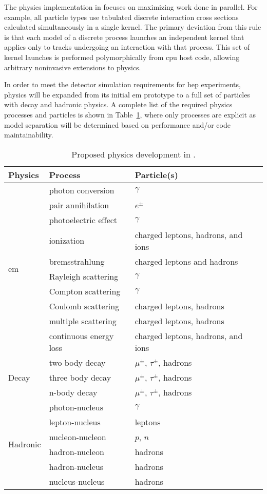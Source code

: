 The physics implementation in \celeritas focuses on maximizing work done in
parallel. For example, all particle types use tabulated discrete interaction
cross sections calculated simultaneously in a single kernel. The primary
deviation from this rule is that each model of a discrete process launches an
independent kernel that applies only to tracks undergoing an interaction with
that process. This set of kernel launches is performed polymorphically from
\ac{cpu} host code, allowing arbitrary noninvasive extensions to \celeritas
physics.

In order to meet the detector simulation requirements for \acs{hep} experiments,
\celeritas physics will be expanded from its initial \ac{em} prototype to a full
set of particles with decay and hadronic physics.  A complete list of the
required physics processes and particles is shown in
Table~\ref{tab:proposed-physics}, where only processes are explicit as model
separation will be determined based on performance and/or code maintainability.
\begin{table}
  \caption{Proposed physics development in \celeritas.}
  \label{tab:proposed-physics}
  \centering
  \begin{tabular}{llll}
    \toprule
    Physics & Process & Particle(s)\\
    \midrule
    \multirow{10}{*}{\acs{em}} & photon conversion & $\gamma$\\
    & pair annihilation & $e^\pm$\\
    & photoelectric effect& $\gamma$\\
    & ionization & charged leptons, hadrons, and ions\\
    & bremsstrahlung & charged leptons and hadrons\\
    & Rayleigh scattering & $\gamma$\\
    & Compton scattering & $\gamma$\\
    & Coulomb scattering & charged leptons, hadrons\\
    & multiple scattering & charged leptons, hadrons\\
    & continuous energy loss & charged leptons, hadrons, and ions\\
    \midrule
    \multirow{3}{*}{Decay}
    & two body decay & $\mu^\pm$, $\tau^\pm$, hadrons\\
    & three body decay & $\mu^\pm$, $\tau^\pm$, hadrons\\
    & n-body decay & $\mu^\pm$, $\tau^\pm$, hadrons\\
    \midrule
    \multirow{6}{*}{Hadronic}
    & photon-nucleus & $\gamma$ \\
    & lepton-nucleus & leptons \\
    & nucleon-nucleon & $p$, $n$\\
    & hadron-nucleon & hadrons\\
    & hadron-nucleus & hadrons\\
    & nucleus-nucleus & hadrons\\
    \bottomrule
  \end{tabular}
\end{table}

